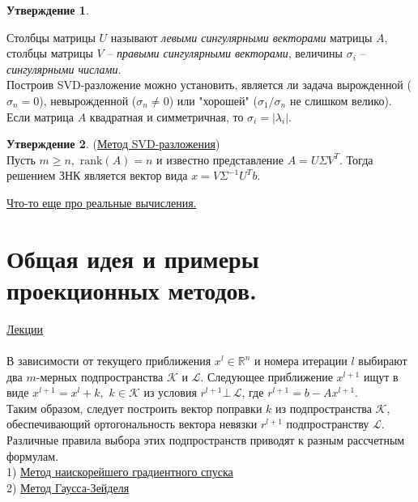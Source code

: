 \documentclass[specialist, subf, href, colorlinks=true, 12pt, times, mtpro, final]{disser}
\theoremstyle{definition}
\newtheorem{state}{Утверждение}[section]
\def\rk{\text{rank}}
\begin{document}
{\begin{state}
    \end{state}
    Столбцы матрицы $U$ называют {\it левыми сингулярными векторами} матрицы $A$, столбцы
    матрицы $V$ --  {\it правыми сингулярными векторами}, величины $\sigma_i$ --
    {\it сингулярными числами}.\\
    Построив SVD-разложение можно установить, является ли задача вырожденной ($\sigma_n=0$),
    невырожденной ($\sigma_n $) или "хорошей"{} ($\sigma_1 / \sigma_n$ не слишком
    велико). Если матрица $A$ квадратная и симметричная, то $\sigma_i = |\lambda_i|$.
    \begin{state} (\hyperlink {lects.73}{Метод SVD-разложения})\\
    Пусть $m \ge n, \,\, \rk(A) = n$ и известно представление $A = U\Sigma V^T$.
    Тогда решением ЗНК является вектор вида $x = V\Sigma^{-1}U^T b$.
    \end{state}
    \hyperlink {lects.73}{Что-то еще про реальные вычисления.}

\section {Общая идея и примеры проекционных методов.}
    \hyperlink {lects.74}{Лекции}\\
    \\
    В зависимости от текущего приближения $x^l \in {}^n$ и номера итерации $l$
    выбирают два $m$-мерных подпространства $$ и $$. Следующее
    приближение $x^{l+1}$ ищут в виде $x^{l+1} = x^l + k, \,\, k\in {}$ из
    условия $r^{l+1} \bot\, $, где $r^{l+1} = b - Ax^{l+1}$.\\
    Таким образом, следует построить вектор поправки $k$ из подпространства $$,
    обеспечивающий ортогональность вектора невязки $r^{l+1}$ подпространству $$.
    Различные правила выбора этих подпространств приводят к разным рассчетным формулам.
    \\
    1) \hyperlink {lects.74}{Метод наискорейшего градиентного спуска}\\
    2) \hyperlink {lects.74}{Метод Гаусса-Зейделя}

}
\end{document}
